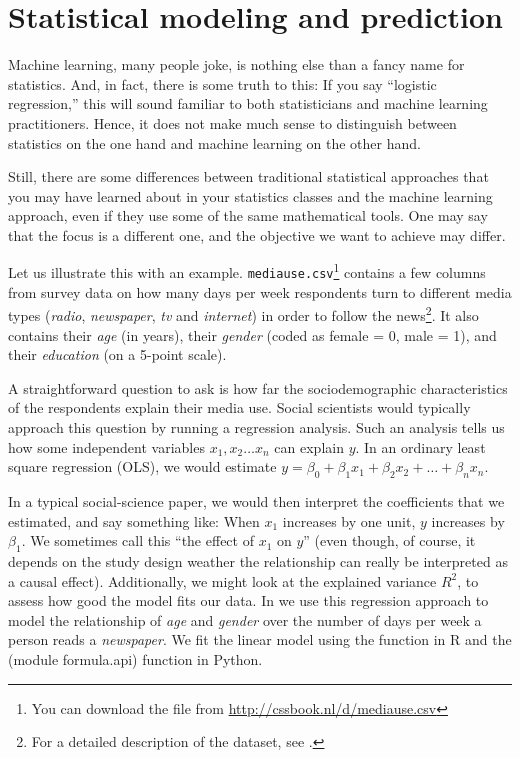 \section{Statistical modeling and prediction}
\label{sec:prediction}
Machine learning, many people joke, is nothing else than a fancy name
for statistics.  And, in fact, there is some truth to this: If you say
``logistic regression,'' this will sound familiar to both
statisticians and machine learning practitioners.  Hence, it does not
make much sense to distinguish between statistics on the one hand and
machine learning on the other hand.

Still, there are some differences between traditional statistical
approaches that you may have learned about in your statistics classes
and the machine learning approach, even if they use some of the same
mathematical tools. One may say that  the focus is a different
one, and the objective we want to achieve may differ.

Let us illustrate this with an example.
\texttt{mediause.csv}\footnote{You can download the file from
  \url{http://cssbook.nl/d/mediause.csv}} contains a few columns from
survey data on how many days per week respondents turn to different
media types (\emph{radio}, \emph{newspaper}, \emph{tv} and \emph{internet}) in order to follow the news\footnote{For a detailed
  description of the dataset, see \citet{Trilling2013phd}.}. It also
contains their \emph{age} (in years), their \emph{gender} (coded as female = 0, male = 1), and their \emph{education} (on a 5-point scale).

A straightforward question to ask is how far the
sociodemographic characteristics of the respondents explain their
media use.  Social scientists would typically approach this question
by running a regression analysis.  Such an analysis tells us how some
independent variables $x_1, x_2 \ldots x_n$ can explain $y$.  In an
ordinary least square regression (OLS), we would estimate $y=\beta_0 +
\beta_1 x_1 + \beta_2 x_2 + \ldots + \beta_n x_n$.

In a typical social-science paper, we would then interpret the coefficients
that we estimated, and say something like: When $x_1$ increases by one unit,
$y$ increases by $\beta_1$.
We sometimes call this ``the effect of $x_1$ on $y$'' (even though, of course,
it depends on the study design weather the relationship can really be interpreted
as a causal effect).
Additionally, we might look at the explained variance $R^2$, to assess how good the model fits our data. In  we use this regression approach to model the relationship of \emph{age} and \emph{gender} over the number of days per week a person reads a \emph{newspaper}. We fit the linear model using the  function  in R and the  (module formula.api) function  in Python.


